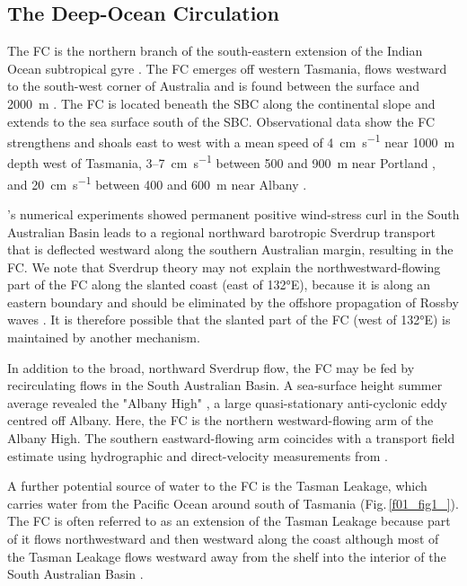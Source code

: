 \documentclass[preprint,3p,review,12pt]{elsarticle}
\newcommand{\citepos}[1]{\citeauthor{#1}'s \citeyearpar{#1}}
\begin{document}
\subsection{The Deep-Ocean Circulation} \label{The Deep-Ocean Circulation}
The FC is the northern branch of the south-eastern extension of the Indian Ocean subtropical gyre \citep{Hufford1997, McCartney2007}. The FC emerges off western Tasmania, flows westward to the south-west corner of Australia and is found between the surface and \SI{2000}{\meter} \citep{Middleton2002}. The FC is located beneath the SBC along the continental slope and extends to the sea surface south of the SBC\@.
Observational data show the FC strengthens and shoals east to west with a mean speed of \SI{4}{\centi\meter\per\second} near \SI{1000}{\meter} depth west of Tasmania, \num{3}--\SI{7}{\centi\meter\per\second} between \num{500} and \SI{900}{\meter} near Portland \citep{Middleton2007}, and \SI{20}{\centi\meter\per\second} between \num{400} and \SI{600}{\meter} near Albany \citep{Cresswell1993}.

\citepos{Middleton2002} numerical experiments showed permanent positive wind-stress curl in the South Australian Basin leads to a regional northward barotropic Sverdrup transport that is deflected westward along the southern Australian margin, resulting in the FC. We note that Sverdrup theory may not explain the northwestward-flowing part of the FC along the slanted coast (east of \ang{132}E), because it is along an eastern boundary \citep{McCreary1981,McCreary1991} and should be eliminated by the offshore propagation of Rossby waves \citep{Anderson1975}. It is therefore possible that the slanted part of the FC (west of \ang{132}E) is maintained by another mechanism.

In addition to the broad, northward Sverdrup flow, the FC may be fed by recirculating flows in the South Australian Basin. A sea-surface height summer average \citep{Middleton2003} revealed the "Albany High" \citep{Middleton2007}, a large quasi-stationary anti-cyclonic eddy centred off Albany. Here, the FC is the northern westward-flowing arm of the Albany High. The southern eastward-flowing arm coincides with a transport field estimate using hydrographic and direct-velocity measurements from \citet{McCartney2007}.

A further potential source of water to the FC is the Tasman Leakage, which carries water from the Pacific Ocean around south of Tasmania (Fig.\,\ref{f01_fig1_}). The FC is often referred to as an extension of the Tasman Leakage because part of it flows northwestward and then westward along the coast \citep{Feng2016,Middleton2002,Rosell-Fieschi2013} although most of the Tasman Leakage flows westward away from the shelf into the interior of the South Australian Basin \citep{Speich2002,vanSebille2012,vanSebille2014}.
\end{document}
